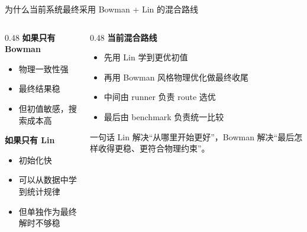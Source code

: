 \documentclass[aspectratio=169,10pt]{ctexbeamer}
\begin{document}
\begin{frame}{为什么当前系统最终采用 Bowman + Lin 的混合路线}
  \begin{columns}[T]
    \begin{column}{0.48\textwidth}
      \textbf{如果只有 Bowman}
      \begin{itemize}
        \item 物理一致性强
        \item 最终结果稳
        \item 但初值敏感，搜索成本高
      \end{itemize}

      \textbf{如果只有 Lin}
      \begin{itemize}
        \item 初始化快
        \item 可以从数据中学到统计规律
        \item 但单独作为最终解时不够稳
      \end{itemize}
    \end{column}
    \begin{column}{0.48\textwidth}
      \textbf{当前混合路线}
      \begin{itemize}
        \item 先用 Lin 学到更优初值
        \item 再用 Bowman 风格物理优化做最终收尾
        \item 中间由 runner 负责 route 选优
        \item 最后由 benchmark 负责统一比较
      \end{itemize}

      \vspace{0.5em}
      \begin{alertblock}{一句话}
        Lin 解决“从哪里开始更好”，Bowman 解决“最后怎样收得更稳、更符合物理约束”。
      \end{alertblock}
    \end{column}
  \end{columns}
\end{frame}
\end{document}
